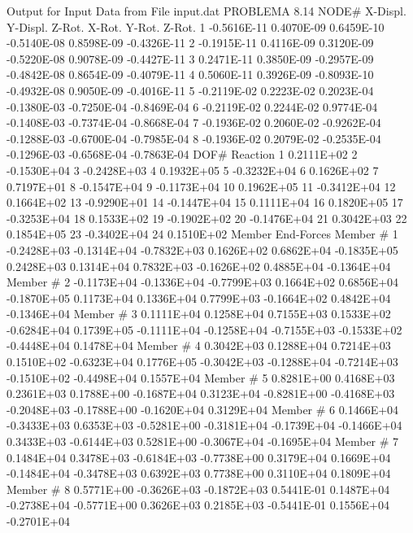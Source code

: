\documentclass{article}
\begin{document}
    Output for Input Data from File input.dat PROBLEMA 8.14 NODE\# X-Displ.
Y-Displ. Z-Rot. X-Rot. Y-Rot. Z-Rot. 1 -0.5616E-11 0.4070E-09 0.6459E-10
-0.5140E-08 0.8598E-09 -0.4326E-11 2 -0.1915E-11 0.4116E-09 0.3120E-09
-0.5220E-08 0.9078E-09 -0.4427E-11 3 0.2471E-11 0.3850E-09 -0.2957E-09
-0.4842E-08 0.8654E-09 -0.4079E-11 4 0.5060E-11 0.3926E-09 -0.8093E-10
-0.4932E-08 0.9050E-09 -0.4016E-11 5 -0.2119E-02 0.2223E-02 0.2023E-04
-0.1380E-03 -0.7250E-04 -0.8469E-04 6 -0.2119E-02 0.2244E-02 0.9774E-04
-0.1408E-03 -0.7374E-04 -0.8668E-04 7 -0.1936E-02 0.2060E-02 -0.9262E-04
-0.1288E-03 -0.6700E-04 -0.7985E-04 8 -0.1936E-02 0.2079E-02 -0.2535E-04
-0.1296E-03 -0.6568E-04 -0.7863E-04 DOF\# Reaction 1 0.2111E+02 2
-0.1530E+04 3 -0.2428E+03 4 0.1932E+05 5 -0.3232E+04 6 0.1626E+02 7
0.7197E+01 8 -0.1547E+04 9 -0.1173E+04 10 0.1962E+05 11 -0.3412E+04 12
0.1664E+02 13 -0.9290E+01 14 -0.1447E+04 15 0.1111E+04 16 0.1820E+05 17
-0.3253E+04 18 0.1533E+02 19 -0.1902E+02 20 -0.1476E+04 21 0.3042E+03 22
0.1854E+05 23 -0.3402E+04 24 0.1510E+02 Member End-Forces Member \# 1
-0.2428E+03 -0.1314E+04 -0.7832E+03 0.1626E+02 0.6862E+04 -0.1835E+05
0.2428E+03 0.1314E+04 0.7832E+03 -0.1626E+02 0.4885E+04 -0.1364E+04
Member \# 2 -0.1173E+04 -0.1336E+04 -0.7799E+03 0.1664E+02 0.6856E+04
-0.1870E+05 0.1173E+04 0.1336E+04 0.7799E+03 -0.1664E+02 0.4842E+04
-0.1346E+04 Member \# 3 0.1111E+04 0.1258E+04 0.7155E+03 0.1533E+02
-0.6284E+04 0.1739E+05 -0.1111E+04 -0.1258E+04 -0.7155E+03 -0.1533E+02
-0.4448E+04 0.1478E+04 Member \# 4 0.3042E+03 0.1288E+04 0.7214E+03
0.1510E+02 -0.6323E+04 0.1776E+05 -0.3042E+03 -0.1288E+04 -0.7214E+03
-0.1510E+02 -0.4498E+04 0.1557E+04 Member \# 5 0.8281E+00 0.4168E+03
0.2361E+03 0.1788E+00 -0.1687E+04 0.3123E+04 -0.8281E+00 -0.4168E+03
-0.2048E+03 -0.1788E+00 -0.1620E+04 0.3129E+04 Member \# 6 0.1466E+04
-0.3433E+03 0.6353E+03 -0.5281E+00 -0.3181E+04 -0.1739E+04 -0.1466E+04
0.3433E+03 -0.6144E+03 0.5281E+00 -0.3067E+04 -0.1695E+04 Member \# 7
0.1484E+04 0.3478E+03 -0.6184E+03 -0.7738E+00 0.3179E+04 0.1669E+04
-0.1484E+04 -0.3478E+03 0.6392E+03 0.7738E+00 0.3110E+04 0.1809E+04
Member \# 8 0.5771E+00 -0.3626E+03 -0.1872E+03 0.5441E-01 0.1487E+04
-0.2738E+04 -0.5771E+00 0.3626E+03 0.2185E+03 -0.5441E-01 0.1556E+04
-0.2701E+04


    
    
    
    
\end{document}
